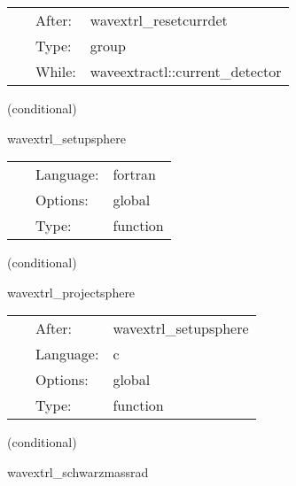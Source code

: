  \begin{tabular*}{160mm}{cll} 
~ & After:  & wavextrl\_resetcurrdet \\ 
~ & Type:  & group \\ 
~ & While:  & waveextractl::current\_detector \\ 
\end{tabular*} 


\vspace{5mm}

   (conditional) 

\hspace{5mm} wavextrl\_setupsphere 

\hspace{5mm}{\it setup sintheta, sinphi arrays } 


\hspace{5mm}

 \begin{tabular*}{160mm}{cll} 
~ & Language:  & fortran \\ 
~ & Options:  & global \\ 
~ & Type:  & function \\ 
\end{tabular*} 


\vspace{5mm}

   (conditional) 

\hspace{5mm} wavextrl\_projectsphere 

\hspace{5mm}{\it interpolate 3d quantities into 2d grid arrays (on the sphere), project onto sphere } 


\hspace{5mm}

 \begin{tabular*}{160mm}{cll} 
~ & After:  & wavextrl\_setupsphere \\ 
~ & Language:  & c \\ 
~ & Options:  & global \\ 
~ & Type:  & function \\ 
\end{tabular*} 


\vspace{5mm}

   (conditional) 

\hspace{5mm} wavextrl\_schwarzmassrad 

